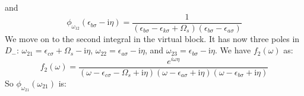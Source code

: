 \documentclass[12pt]{caltech_thesis}
\begin{document}
and
\begin{equation}
\phi_{\omega_{12}}(\epsilon_{b \sigma} - \mathrm{i} \eta) = \frac{1}{(\epsilon_{b \sigma} -\epsilon_{k \sigma}+\Omega_s)(\epsilon_{b \sigma} -\epsilon_{a \sigma})}
\end{equation}
We move on to the second integral in the virtual block. It has now three poles in $D_-$: $\omega_{21} = \epsilon _{c\sigma } + \Omega_s - \mathrm{i} \eta$, $\omega_{22} = \epsilon _{a\sigma } - \mathrm{i} \eta$, and $\omega_{23} = \epsilon _{b\sigma } - \mathrm{i} \eta$. We have $f_2(\omega)$ as:
\begin{equation}
f_2(\omega) = \frac{e^{i\omega \eta }}{(\omega-\epsilon_{c \sigma}-\Omega_s+\mathrm{i} \eta)(\omega-\epsilon_{a \sigma}+\mathrm{i} \eta)(\omega-\epsilon_{b \sigma}+\mathrm{i} \eta)}
\end{equation}
So $\phi_{\omega_{21}}(\omega _{21})$ is:
\end{document}
